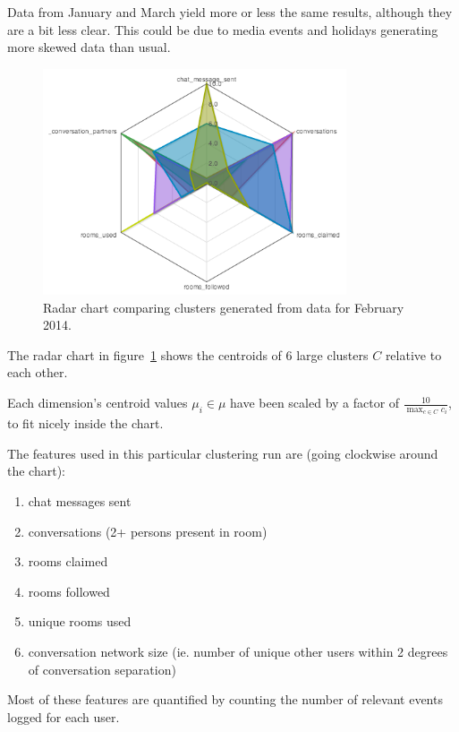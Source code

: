 Data from January and March yield more or less the same results, although they are a bit less clear. This could be due to media events and holidays generating more skewed data than usual.

\begin{figure}[h]
  \centering
    \includegraphics[width=0.8\textwidth]{Figures/clusterings/confluence-post/comp-02-feb}
    \caption{Radar chart comparing clusters generated from data for February 2014.}
    \label{fig:radar-clusters-february}
\end{figure}

The radar chart in figure~\ref{fig:radar-clusters-february} shows the centroids of 6 large clusters $C$ relative to each other.

Each dimension's centroid values $\mu_i \in \mu$ have been scaled by a factor of $\frac{10}{\max_{c \in C}{c_i}}$, to fit nicely inside the chart.

The features used in this particular clustering run are (going clockwise around the chart):

\begin{enumerate}
  \item chat messages sent
  \item conversations (2+ persons present in room)
  \item rooms claimed
  \item rooms followed
  \item unique rooms used
  \item conversation network size (ie. number of unique other users within 2 degrees of conversation separation)
\end{enumerate}

Most of these features are quantified by counting the number of relevant events logged for each user.

